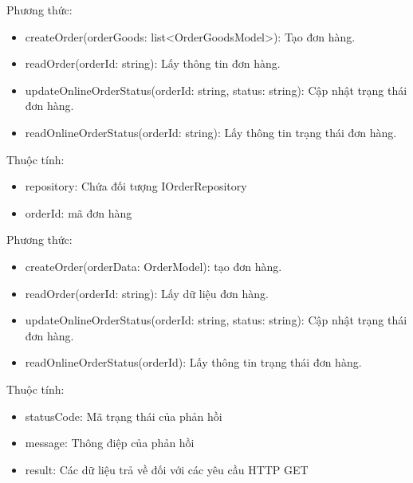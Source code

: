 Phương thức:
\begin{itemize}
	\item createOrder(orderGoods: list<OrderGoodsModel>): Tạo đơn hàng.
	\item readOrder(orderId: string): Lấy thông tin đơn hàng.
	\item updateOnlineOrderStatus(orderId: string, status: string): Cập nhật trạng thái đơn hàng.
	\item readOnlineOrderStatus(orderId: string): Lấy thông tin trạng thái đơn hàng.
\end{itemize}

Thuộc tính:
\begin{itemize}
	\item repository: Chứa đối tượng IOrderRepository
	\item orderId: mã đơn hàng
\end{itemize}
Phương thức:
\begin{itemize}
	\item createOrder(orderData: OrderModel): tạo đơn hàng.
	\item readOrder(orderId: string): Lấy dữ liệu đơn hàng.
	\item updateOnlineOrderStatus(orderId: string, status: string): Cập nhật trạng thái đơn hàng.
	\item readOnlineOrderStatus(orderId): Lấy thông tin trạng thái đơn hàng.
\end{itemize}


Thuộc tính:
\begin{itemize}
	\item statusCode: Mã trạng thái của phản hồi
	\item message: Thông điệp của phản hồi
	\item result: Các dữ liệu trả về đối với các yêu cầu HTTP GET
\end{itemize}



